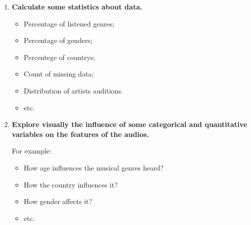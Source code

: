 \documentclass{article}
\begin{document}
\begin{enumerate}
        \item{\textbf{Calculate some statistics about data.}}
        
            \begin{itemize}
                \item Percentage of listened genres;
                \item Percentage of genders;
                \item Percentege of countrys;
                \item Count of missing data;
                \item Distribution of artists auditions.
                \item etc.
            \end{itemize}

        \item{\textbf{Explore visually the influence of some categorical
        and quantitative variables on the features of the audios.}}
        
            For example:

            \begin{itemize}
                \item How age influences the musical genres heard?
                \item How the country influences it?
                \item How gender affects it?
                \item etc.
            \end{itemize}

        \end{enumerate}
\end{document}
